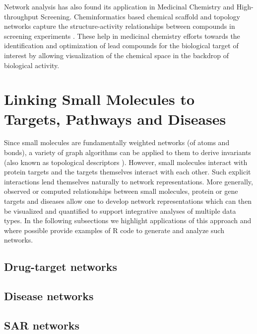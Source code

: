 \documentclass[]{book}
\begin{document}
Network analysis has also found its application in Medicinal Chemistry and High-throughput Screening. Cheminformatics based chemical scaffold and topology networks capture the structure-activity relationships between compounds in screening experiments \cite{varin2011mining}. These help in medicinal chemistry efforts towards the identification and optimization of lead compounds for the  biological target of interest by allowing visualization of the chemical space in the backdrop of biological activity. 
  

\section{Linking Small Molecules to Targets, Pathways and Diseases}
\label{sec:link-small-molec}

Since small molecules are fundamentally weighted networks (of atoms
and bonds), a variety of graph algorithms can be applied to them to
derive invariants (also known as topological descriptors
\cite{Guha:2012vn}). However, small molecules interact with protein
targets and the targets themselves interact with each other. Such
explicit interactions lend themselves naturally to network
representations. More generally, observed or computed relationships
between small molecules, protein or gene targets and diseases allow
one to develop network representations which can then be visualized
and quantified to support integrative analyses of multiple data
types. In the following subsections we highlight applications of this
approach and where possible provide examples of R code to generate and
analyze such networks.

\subsection{Drug-target networks}
\label{sec:drug-target-networks}


\subsection{Disease networks}
\label{sec:disease-networks}

\subsection{SAR networks}
\label{sec:sar-networks}
\end{document}
